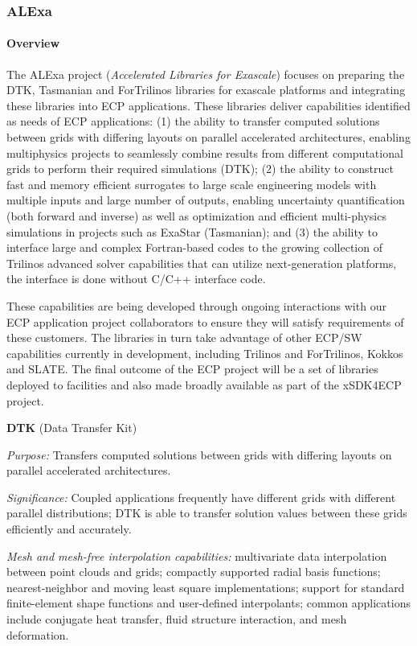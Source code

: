 \subsubsection{ ALExa}


\paragraph{Overview}

The ALExa project ({\sl Accelerated Libraries for Exascale}) focuses on
preparing the DTK, Tasmanian and ForTrilinos libraries for exascale platforms and
integrating these libraries into ECP applications.  These libraries deliver
capabilities identified as needs of ECP applications: (1) the ability to
transfer computed solutions between grids with differing layouts on parallel
accelerated architectures, enabling multiphysics projects to seamlessly
combine results from different computational grids to perform their required
simulations (DTK);
%
(2) the ability to construct fast and memory efficient surrogates to large
scale engineering models with multiple inputs and large number of outputs,
enabling uncertainty quantification (both forward and inverse) as well as
optimization and efficient multi-physics simulations in projects such as
ExaStar (Tasmanian); and
%
(3) the ability to interface large and complex Fortran-based codes to the
growing collection of Trilinos advanced solver capabilities that can
utilize next-generation platforms, the interface is done without C/C++
interface code.

These capabilities are being developed through ongoing interactions with our
ECP application project collaborators to ensure they will satisfy requirements
of these customers.  The libraries in turn take advantage of other ECP/SW
capabilities currently in development, including Trilinos and ForTrilinos,
Kokkos and SLATE.  The final outcome of the ECP project will be a set of
libraries deployed to facilities and also made broadly available as part of
the xSDK4ECP project.


{\bf DTK} (Data Transfer Kit)

{\it Purpose:} Transfers computed solutions between grids with differing
layouts on parallel accelerated architectures.

{\it Significance:} Coupled applications frequently have different grids with
different parallel distributions; DTK is able to transfer solution values
between these grids efficiently and accurately.

{\it Mesh and mesh-free interpolation capabilities:} multivariate data
interpolation between point clouds and grids; compactly supported radial basis
functions; nearest-neighbor and moving least square implementations; support
for standard finite-element shape functions and user-defined interpolants;
common applications include conjugate heat transfer, fluid structure
interaction, and mesh deformation.

